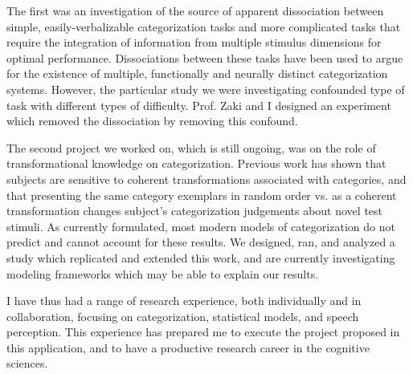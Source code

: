 \documentclass[12pt]{article}
\begin{document}
The first was an investigation of the source of apparent dissociation between simple, easily-verbalizable categorization tasks and more complicated tasks that require the integration of information from multiple stimulus dimensions for optimal performance.  Dissociations between these tasks have been used to argue for the existence of multiple, functionally and neurally distinct categorization systems.  However, the particular study we were investigating confounded type of task with different types of difficulty.  Prof. Zaki and I designed an experiment which removed the dissociation by removing this confound.

The second project we worked on, which is still ongoing, was on the role of transformational knowledge on categorization.  Previous work has shown that subjects are sensitive to coherent transformations associated with categories, and that presenting the same category exemplars in random order vs. as a coherent transformation changes subject's categorization judgements about novel test stimuli.  As currently formulated, most modern models of categorization do not predict and cannot account for these results.  We designed, ran, and analyzed a study which replicated and extended this work, and are currently investigating modeling frameworks which may be able to explain our results.  

I have thus had a range of research experience, both individually and in collaboration, focusing on categorization, statistical models, and speech perception.  This experience has prepared me to execute the project proposed in this application, and to have a productive research career in the cognitive sciences.


{
\fontsize{10}{10}
\selectfont

}
\end{document}
